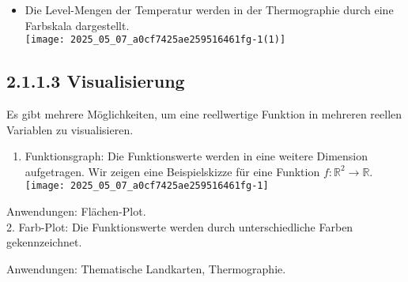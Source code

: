 \documentclass[10pt]{article}
\begin{document}
\begin{itemize}
  \item Die Level-Mengen der Temperatur werden in der Thermographie durch eine Farbskala dargestellt.\\
\texttt{[image: 2025\_05\_07\_a0cf7425ae259516461fg-1(1)]}
\end{itemize}

\subsection*{2.1.1.3 Visualisierung}
Es gibt mehrere Möglichkeiten, um eine reellwertige Funktion in mehreren reellen Variablen zu visualisieren.

\begin{enumerate}
  \item Funktionsgraph: Die Funktionswerte werden in eine weitere Dimension aufgetragen. Wir zeigen eine Beispielskizze für eine Funktion $f: \mathbb{R}^{2} \rightarrow \mathbb{R}$.\\
\texttt{[image: 2025\_05\_07\_a0cf7425ae259516461fg-1]}
\end{enumerate}

Anwendungen: Flächen-Plot.\\
2. Farb-Plot: Die Funktionswerte werden durch unterschiedliche Farben gekennzeichnet.

Anwendungen: Thematische Landkarten, Thermographie.
\end{document}
